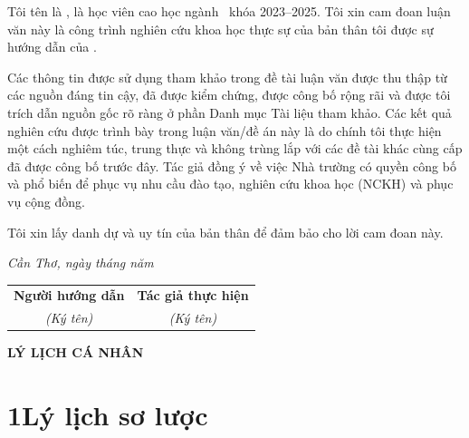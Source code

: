 Tôi tên là \student, là học viên cao học ngành \major\, khóa 2023--2025. Tôi xin cam đoan luận văn này là công trình
nghiên cứu khoa học thực sự của bản thân tôi được sự hướng dẫn của \MainAdvisor.

Các thông tin được sử dụng tham khảo trong đề tài luận văn được thu thập từ các nguồn đáng tin cậy, đã được kiểm chứng, được công bố rộng rãi và được tôi trích dẫn nguồn	gốc rõ ràng ở phần Danh mục Tài liệu tham khảo. Các kết quả nghiên cứu được trình bày trong luận văn/đề án này là do chính tôi thực hiện một cách nghiêm túc, trung thực và không trùng lắp với các đề tài khác cùng cấp đã được công bố trước đây. Tác giả đồng ý về việc Nhà trường có quyền công bố và phổ biến để phục vụ nhu cầu đào tạo, nghiên cứu khoa học (NCKH) và phục vụ cộng đồng.


Tôi xin lấy danh dự và uy tín của bản thân để đảm bảo cho lời cam đoan này.


\begin{flushright}\it 
	Cần Thơ, ngày \quad tháng \quad năm \qquad\,\\
\end{flushright}
\begin{center}
	\begin{tabular*}{.8\columnwidth}{@{\extracolsep\fill}cc@{\extracolsep\fill}} 
		\textbf{Người hướng dẫn} & \textbf{Tác giả thực hiện}\\
		\textit{(Ký tên)} & \textit{(Ký tên)}\\
		
	\end{tabular*}
\end{center}





\newpage
	\vspace*{50pt} %
\begin{center}
	{\fontsize{14}{0pt}\selectfont\bf LÝ LỊCH CÁ NHÂN}
\end{center}
\vspace{20pt}

\section*{1\qquad Lý lịch sơ lược}
\renewcommand{\arraystretch}{1.2}   %

